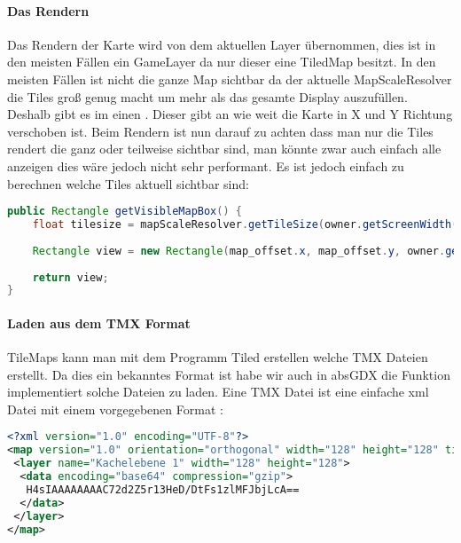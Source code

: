 
\paragraph{Das Rendern}

Das Rendern der Karte wird von dem aktuellen Layer übernommen, dies ist in den meisten Fällen ein GameLayer da nur dieser eine TiledMap besitzt.
In den meisten Fällen ist nicht die ganze Map sichtbar da der aktuelle MapScaleResolver die Tiles groß genug macht um mehr als das gesamte Display auszufüllen. Deshalb gibt es im  einen . Dieser gibt an wie weit die Karte in X und Y Richtung verschoben ist.
Beim Rendern ist nun darauf zu achten dass man nur die Tiles rendert die ganz oder teilweise sichtbar sind, man könnte zwar auch einfach alle anzeigen dies wäre jedoch nicht sehr performant. Es ist jedoch einfach zu berechnen welche Tiles aktuell sichtbar sind:\cite[S 232f.]{DGIJ}

\doinline
\begin{lstlisting}[caption=Ermitteln der aktuell sichtbare Tiles, title=\hspace{0 pt}, language=java]
public Rectangle getVisibleMapBox() {
	float tilesize = mapScaleResolver.getTileSize(owner.getScreenWidth(), owner.getScreenHeight(), map.height, map.width);
	
	Rectangle view = new Rectangle(map_offset.x, map_offset.y, owner.getScreenWidth() / tilesize, owner.getScreenHeight() / tilesize);
	
	return view;
}
\end{lstlisting}

\paragraph{Laden aus dem TMX Format}

TileMaps kann man mit dem Programm Tiled erstellen \cite{TILED} welche TMX Dateien erstellt. Da dies ein bekanntes Format ist habe wir auch in absGDX die Funktion implementiert solche Dateien zu laden. Eine TMX Datei ist eine einfache xml Datei mit einem vorgegebenen Format \cite{TMXDOC}:

\doinline
\begin{lstlisting}[caption=Beipiel einer TMX Datei, title=\hspace{0 pt}, language=xml]
<?xml version="1.0" encoding="UTF-8"?>
<map version="1.0" orientation="orthogonal" width="128" height="128" tilewidth="16" tileheight="16">
 <layer name="Kachelebene 1" width="128" height="128">
  <data encoding="base64" compression="gzip">
   H4sIAAAAAAAAC72d2Z5r13HeD/DtFs1zlMFJbjLcA==
  </data>
 </layer>
</map>
\end{lstlisting}

